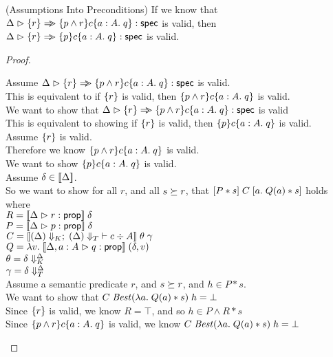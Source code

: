 \begin{lemma}{(Assumptions Into Preconditions)}
If we know that $\judgeS{\setof{r} \specimp \spec{p \land r}{c}{a:A}{q}}$ is
valid, then $\judgeS{\setof{r} \specimp \spec{p}{c}{a:A}{q}}$ is valid.
\end{lemma}

\begin{proof}
\begin{tabbedproof}
  \oo Assume $\judgeS{\setof{r} \specimp \spec{p \land r}{c}{a:A}{q}}$ is valid. \\
  \ooo This is equivalent to if $\setof{r}$ is valid, then $\spec{p \land r}{c}{a:A}{q}$ is valid. \\
  \ooo We want to show that $\judgeS{\setof{r} \specimp \spec{p \land r}{c}{a:A}{q}}$ is valid \\
  \ooo This is equivalent to showing if $\setof{r}$ is valid, then $\spec{p}{c}{a:A}{q}$ is valid. \\
  \ooo Assume $\setof{r}$ is valid. \\
  \oooo Therefore we know $\spec{p \land r}{c}{a:A}{q}$ is valid. \\
  \oooo We want to show $\spec{p}{c}{a:A}{q}$ is valid. \\
  \oooo Assume $\delta \in \interp{\Delta}$.  \\
  \ooooo So we want to show for all $r$, and all $s \worldgeq r$, that $\basicspec{P*s}{C}{a}{Q(a) * s}$ holds\\
  \oooox where \\
  \ooooox $R = \interp{\judgeA{r}{\assert}}\;\delta$ \\
  \ooooox $P = \interp{\judgeA{p}{\assert}}\;\delta$ \\
  \ooooox $C = \interp{\judgeC[\restrictkind{\Delta}]{\restricttype{\Delta}}{c}{A}}\;\theta\;\gamma$ \\
  \ooooox $Q = \semfun{v}{\interp{\judgeA[\Delta,a:A]{q}{\assert}}\;(\delta,v)}$ \\
  \ooooox $\theta = \restricttyenv{\Delta}{\delta}$ \\
  \ooooox $\gamma = \restrictvals{\Delta}{\delta}$ \\
  \ooooo Assume a semantic predicate $r$, and $s \worldgeq r$, and $h \in P * s$. \\
  \oooooo We want to show that $C\;\mathit{Best}(\semfun{a}{Q(a) * s})\;h = \bot$ \\
  \oooooo Since $\setof{r}$ is valid, we know $R = \top$, and so $h \in P \land R * s$ \\
  \oooooo Since $\spec{p \land r}{c}{a:A}{q}$ is valid, we know $C\;\mathit{Best}(\semfun{a}{Q(a) * s})\;h = \bot$\\
\end{tabbedproof}
\end{proof}

